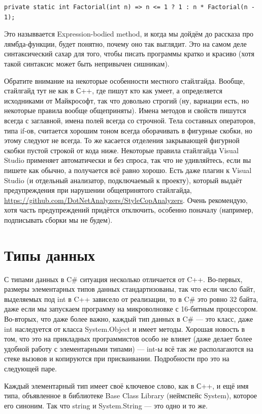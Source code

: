 \documentclass[a5paper]{article}
\begin{document}
\begin{verbatim}
private static int Factorial(int n) => n <= 1 ? 1 : n * Factorial(n - 1);
\end{verbatim}

Это назыввается Expression-bodied method, и когда мы дойдём до рассказа про лямбда-функции, будет понятно, почему оно так выглядит. Это на самом деле синтаксический сахар для того, чтобы писать программы кратко и красиво (хотя такой синтаксис может быть непривычен сишникам).

Обратите внимание на некоторые особенности местного стайлгайда. Вообще, стайлгайд тут не как в С++, где пишут кто как умеет, а определяется исходниками от Майкрософт, так что довольно строгий (ну, вариации есть, но некоторые правила вообще общеприняты). Имена методов и свойств пишутся всегда с заглавной, имена полей всегда со строчной. Тела составных операторов, типа if-ов, считается хорошим тоном всегда оборачивать в фигурные скобки, но этому следуют не всегда. То же касается отделения закрывающей фигурной скобки пустой строкой от кода ниже. Некоторые правила стайлгайда Visual Studio применяет автоматически и без спроса, так что не удивляйтесь, если вы пишете как обычно, а получается всё равно хорошо. Есть даже плагин к Visual Studio (и отдельный анализатор, подключаемый к проекту), который выдаёт предупреждения при нарушении общепринятого стайлгайда, \url{https://github.com/DotNetAnalyzers/StyleCopAnalyzers}. Очень рекомендую, хотя часть предупреждений придётся отключить, особенно поначалу (например, подписывать сборки мы не будем).

\section{Типы данных}

С типами данных в C\# ситуация несколько отличается от C++. Во-первых, размеры элементарных типов данных стандартизованы, так что если число байт, выделяемых под int в C++ зависело от реализации, то в C\# это ровно 32 байта, даже если мы запускаем программу на микроволновке с 16-битным процессором. Во-вторых, что даже более важно, каждый тип данных в C\# --- это класс, даже int наследуется от класса System.Object и имеет методы. Хорошая новость в том, что это на прикладных программистов особо не влияет (даже делает более удобной работу с элементарными типами) --- int-ы всё так же располагаются на стеке вызовов и копируются при присваивании. Подробности про это на следующей паре.

Каждый элементарный тип имеет своё ключевое слово, как в С++, и ещё имя типа, объявленное в библиотеке Base Class Library (неймспейс System), которое его синоним. Так что string и System.String --- это одно и то же.
\end{document}
